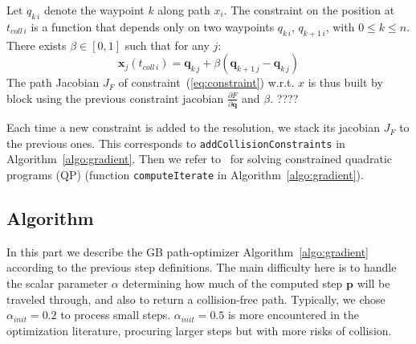 \documentclass{tADR2e}
\newcommand\p{\mathbf{p}}
\newcommand\pii{\mathbf{p_{i,i+1}}}
\newcommand\conf{\mathbf{q}}
\newcommand\xx{\mathbf{x}}
\begin{document}
\vspace{0.2cm}

Let $q_{k\,i}$ denote the waypoint $k$ along path $x_i$.
The constraint on the position at $t_{coll\,i}$ is a function that depends only
on two waypoints $q_{k\,i}$, $q_{k+1\,i}$, with $0\leq k\leq n$. There exists 
$\beta\in[0,1]$ such that for any $j$:
$$
\xx_j (t_{coll\,i}) = \conf_{k\,j} + \beta (\conf_{k+1\,j} - \conf_{k\,j})
$$
The path Jacobian $J_F$ of constraint~(\ref{eq:constraint}) w.r.t. $x$ is thus built by block using the previous constraint jacobian $\frac{\partial F}{\partial \conf}$ and $\beta$. ????


\vspace{0.2cm}

Each time a new constraint is added to the resolution, we stack its jacobian $J_F$ to the previous ones. This corresponds to \texttt{addCollisionConstraints} in 
Algorithm~\ref{algo:gradient}. Then we refer to~\cite{nocedal2006numerical} for solving constrained quadratic programs (QP) (function \texttt{computeIterate} in 
Algorithm~\ref{algo:gradient}).



\subsection{Algorithm}

In this part we describe the GB path-optimizer Algorithm~\ref{algo:gradient} 
according to the previous step definitions. The main difficulty here is to handle 
the scalar parameter $\alpha$ determining how much of the computed step $\p$ will 
be traveled through, and also to return a collision-free path. Typically, we 
chose $\alpha_{init} = 0.2$ to process small steps. $\alpha_{init} = 0.5$ is more 
encountered in the optimization literature, procuring larger steps but with more 
risks of collision.
\end{document}
